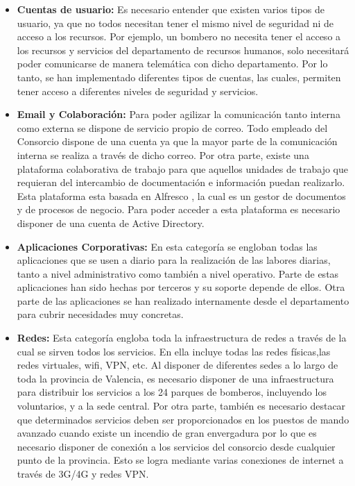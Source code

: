 \documentclass[12pt,a4paper,titlepage,twoside]{report}
\begin{document}
\begin{itemize}
\item \textbf{Cuentas de usuario:} Es necesario entender que existen varios tipos de usuario, ya que no todos necesitan tener el mismo nivel de seguridad ni de acceso a los recursos. Por ejemplo, un bombero no necesita tener el acceso a los recursos y servicios del departamento de recursos humanos, solo necesitará poder comunicarse de manera telemática con dicho departamento. Por lo tanto, se han implementado diferentes tipos de cuentas, las cuales, permiten tener acceso a diferentes niveles de seguridad y servicios. 
\item \textbf{Email y Colaboración:} Para poder agilizar la comunicación tanto interna como externa se dispone de servicio propio de correo. Todo empleado del Consorcio dispone de una cuenta ya que la mayor parte de la comunicación interna se realiza a través de dicho correo. Por otra parte, existe una plataforma colaborativa de trabajo para que aquellos unidades de trabajo que requieran del intercambio de documentación e información puedan realizarlo. Esta plataforma esta basada en Alfresco \cite{alfresco}, la cual es un gestor de documentos y de procesos de negocio.  Para poder acceder a esta plataforma es necesario disponer de una cuenta de Active Directory.
\item \textbf{Aplicaciones Corporativas:} En esta categoría se engloban todas las aplicaciones que se usen a diario para la realización de las labores diarias, tanto a nivel administrativo como también a nivel operativo. Parte de estas aplicaciones han sido hechas por terceros y su soporte depende de ellos. Otra parte de las aplicaciones se han realizado internamente desde el departamento para cubrir necesidades muy concretas.
\item \textbf{Redes:} Esta categoría engloba toda la infraestructura de redes a través de la cual se sirven todos los servicios. En ella incluye todas las redes físicas,las redes virtuales, wifi, VPN, etc. Al disponer de diferentes sedes a lo largo de toda la provincia de Valencia, es necesario disponer de una infraestructura para distribuir los servicios a los 24 parques de bomberos, incluyendo los voluntarios, y a la sede central. Por otra parte, también es necesario destacar que determinados servicios deben ser proporcionados en los puestos de mando avanzado cuando existe un incendio de gran envergadura por lo que es necesario disponer de conexión a los servicios del consorcio desde cualquier punto de la provincia. Esto se logra mediante varias conexiones de internet a través de 3G/4G y redes VPN.

\end{itemize}
\end{document}
